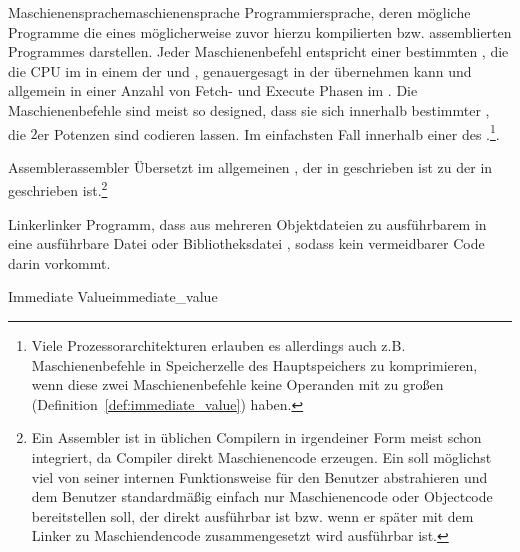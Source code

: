  \begin{Definition}{Maschienensprache}{maschienensprache}
    Programmiersprache, deren mögliche Programme die  eines möglicherweise zuvor hierzu kompilierten bzw. assemblierten Programmes darstellen. Jeder Maschienenbefehl entspricht einer bestimmten , die die CPU im  in einem  der  und , genauergesagt in der  übernehmen kann und allgemein in einer  Anzahl von Fetch- und Execute Phasen im . Die Maschienenbefehle sind meist so designed, dass sie sich innerhalb bestimmter , die $2$er Potenzen sind codieren lassen. Im einfachsten Fall innerhalb einer  des .\footnote{Viele Prozessorarchitekturen erlauben es allerdings auch z.B.  Maschienenbefehle in  Speicherzelle des Hauptspeichers zu komprimieren, wenn diese zwei Maschienenbefehle keine Operanden mit zu großen  (Definition~\ref{def:immediate_value}) haben.}.
  \end{Definition}

  \begin{Definition}{Assembler}{assembler}
    Übersetzt im allgemeinen , der in  geschrieben ist zu  der in  geschrieben ist.\footnote{Ein Assembler ist in üblichen Compilern in irgendeiner Form meist schon integriert, da Compiler direkt Maschienencode erzeugen. Ein  soll möglichst viel von seiner internen Funktionsweise für den Benutzer abstrahieren und dem Benutzer standardmäßig einfach nur Maschienencode oder Objectcode bereitstellen soll, der direkt ausführbar ist bzw. wenn er später mit dem Linker zu Maschiendencode zusammengesetzt wird ausführbar ist.}
  \end{Definition}

  \begin{Definition}{Linker}{linker}
    Programm, dass  aus mehreren Objektdateien zu ausführbarem  in eine ausführbare Datei oder Bibliotheksdatei , sodass kein vermeidbarer  Code darin vorkommt.
  \end{Definition}

  \begin{Definition}{Immediate Value}{immediate_value}

  \end{Definition}

